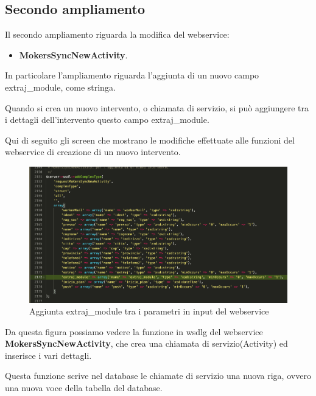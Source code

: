 \subsection{Secondo ampliamento}
Il secondo ampliamento riguarda la modifica del webservice:
\begin{itemize}
	\item \textbf{MokersSyncNewActivity}.
\end{itemize}
\begin{flushleft}
	In particolare l'ampliamento riguarda l'aggiunta di un nuovo campo extraj\_module, come  stringa.
	
	Quando si crea un nuovo intervento, o chiamata di servizio, si può aggiungere tra i dettagli dell'intervento questo campo extraj\_module.
	
	Qui di seguito gli screen che mostrano le modifiche effettuate alle funzioni del webservice di creazione di un nuovo intervento.
\end{flushleft}
\newspace
\begin{figure}[!h] 
	\centering
	\includegraphics[scale = 0.4]{immagini/webservices/ampliamenti/2ampl_prototipo_types.png}
	\caption{Aggiunta extraj\_module tra i parametri in input del webservice}
\end{figure}
\newspace
\begin{flushleft}
	Da questa figura possiamo vedere la funzione in \gls{wsdlg} del webservice \textbf{MokersSyncNewActivity}, che crea una chiamata di servizio(Activity) ed inserisce i vari dettagli. 
	
	Questa funzione scrive nel database le chiamate di servizio una nuova riga, ovvero una nuova voce della tabella del database.
\end{flushleft}

\newpage

